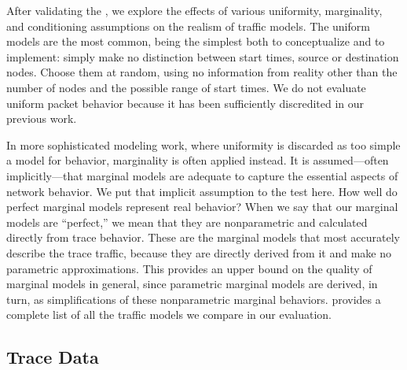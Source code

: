 \documentclass[twocolumn,final]{svjour3}
\begin{document}
After validating the , we explore the effects of various uniformity, marginality, and conditioning assumptions on the realism of traffic models. The uniform models are the most common, being the simplest both to conceptualize and to implement: simply make no distinction between start times, source or destination nodes. Choose them at random, using no information from reality other than the number of nodes and the possible range of start times. We do not evaluate uniform packet behavior because it has been sufficiently discredited in our previous work.

In more sophisticated modeling work, where uniformity is discarded as too simple a model for behavior, marginality is often applied instead. It is assumed---often implicitly---that marginal models are adequate to capture the essential aspects of network behavior. We put that implicit assumption to the test here. How well do perfect marginal models represent real behavior? When we say that our marginal models are ``perfect,'' we mean that they are nonparametric and calculated directly from trace behavior. These are the marginal models that most accurately describe the trace traffic, because they are directly derived from it and make no parametric approximations. This provides an upper bound on the quality of marginal models in general, since parametric marginal models are derived, in turn, as simplifications of these nonparametric marginal behaviors.  provides a complete list of all the traffic models we compare in our evaluation.


\subsection{Trace Data}\label{sec:trace-data}
\end{document}

